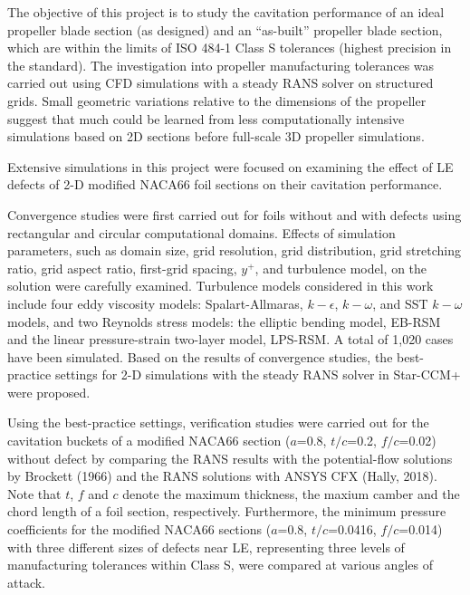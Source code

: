 \documentclass[onecolumn,11pt]{report}
\begin{document}
The objective of this project is to study the cavitation performance of an ideal propeller blade section (as designed) and an “as-built” propeller blade section, which are within the limits of ISO 484-1 Class S tolerances (highest precision in the standard). The investigation into propeller manufacturing tolerances was carried out using CFD simulations with a steady RANS solver on structured grids. Small geometric variations relative to the dimensions of the propeller suggest that much could be learned from less computationally intensive simulations based on 2D sections before full-scale 3D propeller simulations. 

Extensive simulations in this project were focused on examining the effect of LE defects of 2-D modified NACA66 foil sections on their cavitation performance. 

Convergence studies were first carried out for foils without and with defects using rectangular and circular computational domains. Effects of simulation parameters, such as domain size, grid resolution, grid distribution, grid stretching ratio, grid aspect ratio, first-grid spacing, $y^+$, and turbulence model, on the solution were carefully examined. Turbulence models considered in this work include four eddy viscosity models: Spalart-Allmaras, $k-\epsilon$, $k-\omega$, and SST $k-\omega$ models, and two Reynolds stress models: the elliptic bending model, EB-RSM and the linear pressure-strain two-layer model, LPS-RSM. A total of 1,020 cases have been simulated. Based on the results of convergence studies, the best-practice settings for 2-D simulations with  the steady RANS solver in Star-CCM+ were proposed. 

Using the best-practice settings, verification studies were carried out for the cavitation buckets of a modified NACA66 section ($a$=0.8, $t/c$=0.2, $f/c$=0.02) without defect by comparing the RANS results with the potential-flow solutions by Brockett (1966) and the RANS solutions with ANSYS CFX (Hally, 2018). Note that $t$, $f$ and $c$ denote the maximum thickness, the maxium camber and the chord length of a foil section, respectively. Furthermore, the minimum pressure coefficients for the modified NACA66 sections ($a$=0.8, $t/c$=0.0416, $f/c$=0.014) with three different sizes of defects near LE, representing three levels of manufacturing tolerances within Class S, were compared at various angles of attack.


\end{document}
